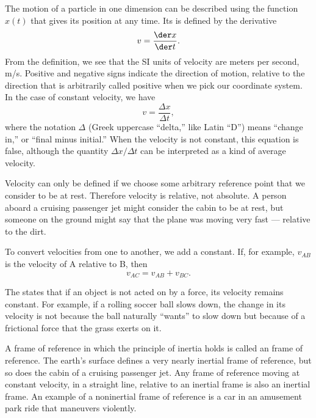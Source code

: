 The motion of a particle in one dimension can be described using the
function $x(t)$ that gives its position at any time. Its  is
defined by the derivative
\begin{equation}
  v = \frac{\der x}{\der t}.
\end{equation}
From the definition, we see that the SI units of velocity are meters per second, m/s.
Positive and negative signs indicate the direction of motion, relative
to the direction that is arbitrarily called positive when we pick our
coordinate system. In the case of constant velocity, we have
\begin{equation}
  v = \frac{\Delta x}{\Delta t},
\end{equation}
where the notation $\Delta$ (Greek uppercase ``delta,'' like Latin ``D'') means ``change in,''
or ``final minus initial.'' When the velocity is not constant, this equation is false,
although the quantity $\Delta x/\Delta t$ can be interpreted as a kind of average velocity.

Velocity can only be defined if we choose some arbitrary reference point that we consider
to be at rest. Therefore velocity is relative, not absolute. A person aboard a cruising
passenger jet might consider the cabin to be at rest, but someone on the ground might
say that the plane was moving very fast --- relative to the dirt.

To convert velocities
from one  to another, we add a constant. If, for example, $v_{AB}$ is the velocity
of A relative to B, then
\begin{equation}
  v_{AC} = v_{AB}+v_{BC}.
\end{equation}

The 
states that if an object is not acted on by a force, its
velocity remains constant. For example, if a rolling soccer ball slows down, the change in
its velocity is not because the ball naturally ``wants'' to slow down but because of a frictional
force that the grass exerts on it.

A frame of reference in which the principle of inertia holds
is called an  frame of reference.
The earth's surface defines a very nearly inertial
frame of reference, but so does the cabin of a cruising passenger jet. Any frame of reference
moving at constant velocity, in a straight line, relative to an inertial frame is also an
inertial frame. An example of a noninertial frame of reference is a car in an amusement
park ride that maneuvers violently.

